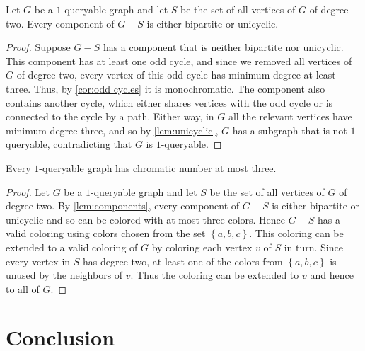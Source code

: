 \begin{lemma}\label{lem:components}Let $G$ be a $1$-queryable graph and let $S$ be the set of all vertices of $G$ of degree two. Every component of $G-S$ is either bipartite or unicyclic.
\end{lemma}
\begin{proof}Suppose $G-S$ has a component that is neither bipartite nor unicyclic. This component has at least one odd cycle, and since we removed all vertices of $G$ of degree two, every vertex of this odd cycle has minimum degree at least three. Thus, by \autoref{cor:odd cycles} it is monochromatic. The component also contains another cycle, which either shares vertices with the odd cycle or is connected to the cycle by a path. Either way, in $G$ all the relevant vertices have minimum degree three, and so by \autoref{lem:unicyclic}, $G$ has a subgraph that is not $1$-queryable, contradicting that $G$ is $1$-queryable.
\end{proof}

\begin{theorem}Every $1$-queryable graph has chromatic number at most three.
\end{theorem}
\begin{proof}Let $G$ be a $1$-queryable graph and let $S$ be the set of all vertices of $G$ of degree two. By \autoref{lem:components}, every component of $G-S$ is either bipartite or unicyclic and so can be colored with at most three colors. Hence $G-S$ has a valid coloring using colors chosen from the set $\left\{a,b,c\right\}$. This coloring can be extended to a valid coloring of $G$ by coloring each vertex $v$ of $S$ in turn. Since every vertex in $S$ has degree two, at least one of the colors from $\left\{a,b,c\right\}$ is unused by the neighbors of $v$. Thus the coloring can be extended to $v$ and hence to all of $G$.
\end{proof}

\section{Conclusion}

